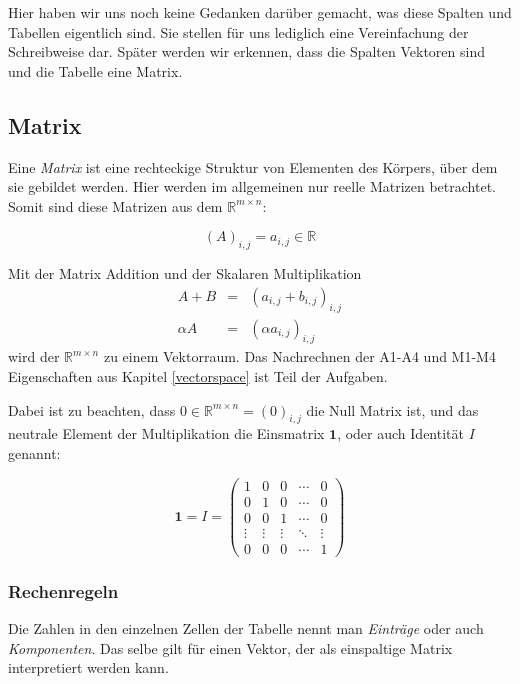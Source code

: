 Hier haben wir uns noch keine Gedanken darüber gemacht, was diese Spalten und Tabellen eigentlich sind. Sie stellen für uns lediglich eine Vereinfachung der Schreibweise dar. Später werden wir erkennen, dass die Spalten Vektoren sind und die Tabelle eine Matrix.


\subsection{Matrix}

\begin{definition}
Eine \textsl{Matrix}  ist eine rechteckige Struktur von Elementen des Körpers, über dem sie gebildet werden. Hier werden im allgemeinen nur reelle Matrizen betrachtet. Somit sind diese Matrizen aus dem $\mathbb{R}^{m\times n}$:
\end{definition}

\begin{equation*}
(A)_{i,j} = a_{i,j} \in \mathbb{R}
\end{equation*}

Mit der Matrix Addition und der Skalaren Multiplikation
\begin{eqnarray*}
A+B &=& (a_{i,j} + b_{i,j})_{i,j} \\
\alpha A &=& (\alpha a_{i,j})_{i,j}
\end{eqnarray*}
wird der $\mathbb{R}^{m\times n}$ zu einem Vektorraum. Das Nachrechnen der A1-A4 und M1-M4 Eigenschaften aus Kapitel \ref{vectorspace} ist Teil der Aufgaben.

Dabei ist zu beachten, dass $0 \in \mathbb{R}^{m\times n} = (0)_{i,j}$ die Null Matrix ist, und das neutrale Element der Multiplikation die Einsmatrix $\mathbf{1}$, oder auch Identität $I$ genannt:

\[
\mathbf{1} = I =
\begin{pmatrix}
1 & 0 & 0 & \cdots & 0 \\
0 & 1 & 0 & \cdots & 0 \\
0 & 0 & 1 & \cdots & 0 \\
\vdots & \vdots & \vdots & \ddots & \vdots \\
0 & 0 & 0 & \cdots & 1
\end{pmatrix}
\]

\subsubsection{Rechenregeln}

\begin{definition}
Die Zahlen in den einzelnen Zellen der Tabelle nennt man \textsl{Einträge} oder auch \textsl{Komponenten}. Das selbe gilt für einen Vektor, der als einspaltige Matrix interpretiert werden kann.
\end{definition}

